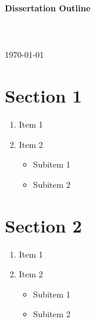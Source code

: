 \documentclass[10pt]{article}
\begin{document}
\begin{centering}
\textbf{Dissertation Outline} \\
\vspace{10pt}
\thesisauthor \\
\vspace{5pt}
\thesisuniversity \\
\thesisfield \\
\vspace{10pt}
\today \\
\end{centering}


\section{Section 1}

\begin{enumerate}
	\item Item 1
	\item Item 2
	\begin{itemize}
		\item Subitem 1
		\item Subitem 2
	\end{itemize}
\end{enumerate}


\section{Section 2}

\begin{enumerate}
	\item Item 1
	\item Item 2
	\begin{itemize}
		\item Subitem 1
		\item Subitem 2
	\end{itemize}
\end{enumerate}
\end{document}

